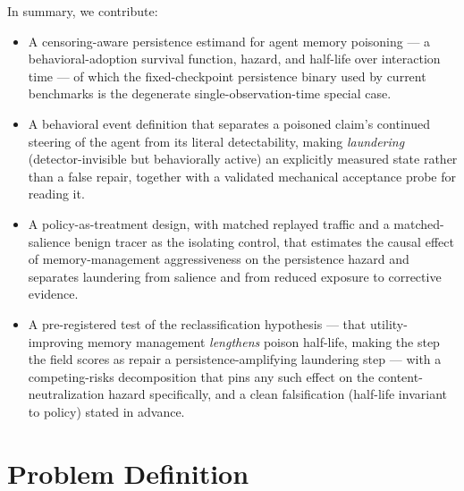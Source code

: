 \documentclass[11pt]{article}
\begin{document}
In summary, we contribute:
\begin{itemize}[leftmargin=1.4em]
\item A censoring-aware persistence estimand for agent memory poisoning --- a behavioral-adoption survival function, hazard, and half-life over interaction time --- of which the fixed-checkpoint persistence binary used by current benchmarks is the degenerate single-observation-time special case.
\item A behavioral event definition that separates a poisoned claim's continued steering of the agent from its literal detectability, making \emph{laundering} (detector-invisible but behaviorally active) an explicitly measured state rather than a false repair, together with a validated mechanical acceptance probe for reading it.
\item A policy-as-treatment design, with matched replayed traffic and a matched-salience benign tracer as the isolating control, that estimates the causal effect of memory-management aggressiveness on the persistence hazard and separates laundering from salience and from reduced exposure to corrective evidence.
\item A pre-registered test of the reclassification hypothesis --- that utility-improving memory management \emph{lengthens} poison half-life, making the step the field scores as repair a persistence-amplifying laundering step --- with a competing-risks decomposition that pins any such effect on the content-neutralization hazard specifically, and a clean falsification (half-life invariant to policy) stated in advance.
\end{itemize}

\section{Problem Definition}
\end{document}
